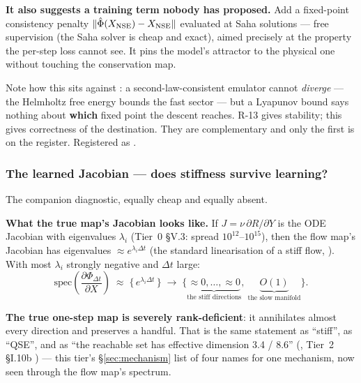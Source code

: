 \textbf{It also suggests a training term nobody has proposed.} Add a fixed-point
consistency penalty $\|\hat\Phi(X_{\mathrm{NSE}}) - X_{\mathrm{NSE}}\|$
evaluated at Saha solutions --- free supervision (the Saha solver is cheap and
exact), aimed precisely at the property the per-step loss cannot see. It pins
the model's attractor to the physical one without touching the conservation map.

Note how this sits against : a second-law-consistent
emulator cannot \emph{diverge} --- the Helmholtz free energy bounds the fast
sector --- but a Lyapunov bound says nothing about \textbf{which} fixed point
the descent reaches. R-13 gives stability; this gives correctness of the
destination. They are complementary and only the first is on the register.
Registered as .

\subsubsection{The learned Jacobian --- does stiffness survive learning?}
\label{sec:jacobian}

The companion diagnostic, equally cheap and equally absent.

\textbf{What the true map's Jacobian looks like.} If $J = \nu\,\partial R/\partial Y$
is the ODE Jacobian with eigenvalues $\lambda_i$ (Tier~0 \S V.3: spread
$10^{12}$--$10^{15}$), then the flow map's Jacobian has eigenvalues
$\approx e^{\lambda_i \Delta t}$ (the standard linearisation of a stiff flow,
\citealt{hairer1996}). With most $\lambda_i$ strongly negative and $\Delta t$
large:
%
\begin{equation}
\label{eq:flowspectrum}
\text{spec}\!\left(\frac{\partial \Phi_{\Delta t}}{\partial X}\right)
\;\approx\; \big\{\,e^{\lambda_i \Delta t}\,\big\}
\;\longrightarrow\; \{\underbrace{\approx 0,\dots,\approx 0}_{\text{the stiff directions}},\ \underbrace{O(1)}_{\text{the slow manifold}}\} .
\end{equation}

\textbf{The true one-step map is severely rank-deficient}: it annihilates almost
every direction and preserves a handful. That is the same statement as
``stiff'', as ``QSE'', and as ``the reachable set has effective dimension
3.4 / 8.6'' (, Tier~2 \S I.10b \derivedthere) --- this
tier's \S\ref{sec:mechanism} list of four names for one mechanism, now seen
through the flow map's spectrum.

